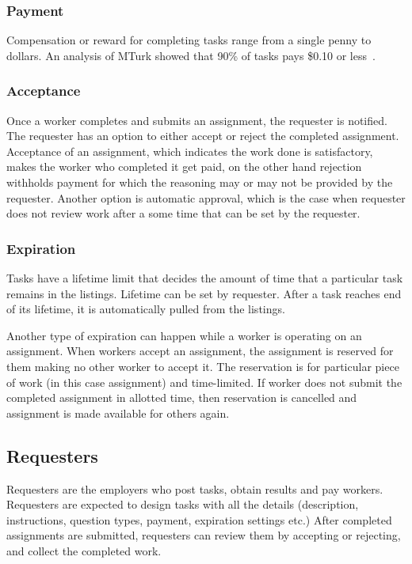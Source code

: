 \subsubsection{Payment}
Compensation or reward for completing tasks range from a single penny to dollars. 
An analysis of MTurk showed that 90\% of tasks pays \$0.10 or less~\cite{Ipeirotis2010}.

\subsubsection{Acceptance}
Once a worker completes and submits an assignment, the requester is notified. 
The requester has an option to either accept or reject the completed assignment. 
Acceptance of an assignment, which indicates the work done is satisfactory, 
makes the worker who completed it get paid, on the other hand rejection withholds 
payment for which the reasoning may or may not be provided by the requester. 
Another option is automatic approval, which is the case when requester does not 
review work after a some time that can be set by the requester.

\subsubsection{Expiration}
Tasks have a lifetime limit that decides the amount of time that a particular task 
remains in the listings. Lifetime can be set by requester. After a task reaches 
end of its lifetime, it is automatically pulled from the listings.

Another type of expiration can happen while a worker is operating on an assignment. 
When workers accept an assignment, the assignment is reserved for them making 
no other worker to accept it. The reservation is for particular piece of work 
(in this case assignment) and time-limited. If worker does not submit the completed 
assignment in allotted time, then reservation is cancelled and assignment is 
made available for others again.

\subsection{Requesters}
Requesters are the employers who post tasks, obtain results and pay workers. 
Requesters are expected to design tasks with all the details (description, instructions, 
question types, payment, expiration settings etc.) After completed assignments 
are submitted, requesters can review them by accepting or rejecting, 
and collect the completed work. 

